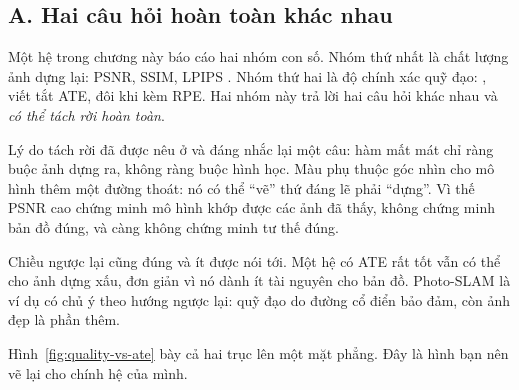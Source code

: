 \documentclass[../../deep_learning.tex]{subfiles}
\begin{document}
\subsection{A. Hai câu hỏi hoàn toàn khác nhau}
Một hệ trong chương này báo cáo hai nhóm con số. Nhóm thứ nhất là chất lượng ảnh dựng lại: PSNR, SSIM, LPIPS \cite{wang2004ssim,zhang2018lpips}. Nhóm thứ hai là độ chính xác quỹ đạo: , viết tắt ATE, đôi khi kèm RPE. Hai nhóm này trả lời hai câu hỏi khác nhau và \emph{có thể tách rời hoàn toàn}.

Lý do tách rời đã được nêu ở  và đáng nhắc lại một câu: hàm mất mát chỉ ràng buộc ảnh dựng ra, không ràng buộc hình học. Màu phụ thuộc góc nhìn cho mô hình thêm một đường thoát: nó có thể ``vẽ'' thứ đáng lẽ phải ``dựng''. Vì thế PSNR cao chứng minh mô hình khớp được các ảnh đã thấy, không chứng minh bản đồ đúng, và càng không chứng minh tư thế đúng.

Chiều ngược lại cũng đúng và ít được nói tới. Một hệ có ATE rất tốt vẫn có thể cho ảnh dựng xấu, đơn giản vì nó dành ít tài nguyên cho bản đồ. Photo-SLAM là ví dụ có chủ ý theo hướng ngược lại: quỹ đạo do đường cổ điển bảo đảm, còn ảnh đẹp là phần thêm.

Hình~\ref{fig:quality-vs-ate} bày cả hai trục lên một mặt phẳng. Đây là hình bạn nên vẽ lại cho chính hệ của mình.
\end{document}
